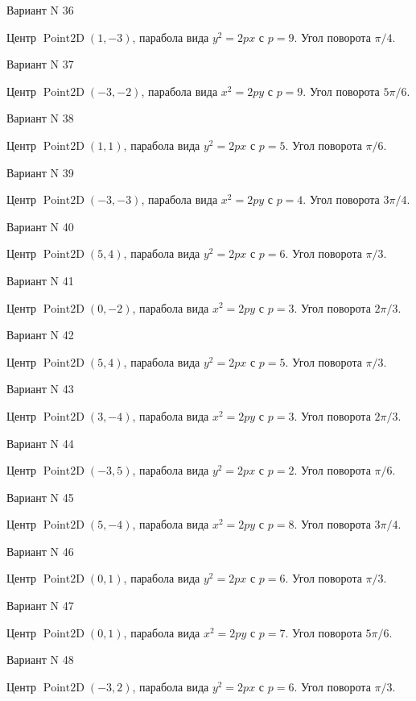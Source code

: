 \documentclass[11pt]{report}
\begin{document}
Вариант N 36

Центр $\operatorname{Point2D}\left(1, -3\right)$, парабола вида $y^{2} = 2px$ с $p = 9$. Угол поворота $\pi / 4$.

Вариант N 37

Центр $\operatorname{Point2D}\left(-3, -2\right)$, парабола вида $x^{2} = 2py$ с $p = 9$. Угол поворота $5 \pi / 6$.

Вариант N 38

Центр $\operatorname{Point2D}\left(1, 1\right)$, парабола вида $y^{2} = 2px$ с $p = 5$. Угол поворота $\pi / 6$.

Вариант N 39

Центр $\operatorname{Point2D}\left(-3, -3\right)$, парабола вида $x^{2} = 2py$ с $p = 4$. Угол поворота $3 \pi / 4$.

Вариант N 40

Центр $\operatorname{Point2D}\left(5, 4\right)$, парабола вида $y^{2} = 2px$ с $p = 6$. Угол поворота $\pi / 3$.

Вариант N 41

Центр $\operatorname{Point2D}\left(0, -2\right)$, парабола вида $x^{2} = 2py$ с $p = 3$. Угол поворота $2 \pi / 3$.

Вариант N 42

Центр $\operatorname{Point2D}\left(5, 4\right)$, парабола вида $y^{2} = 2px$ с $p = 5$. Угол поворота $\pi / 3$.

Вариант N 43

Центр $\operatorname{Point2D}\left(3, -4\right)$, парабола вида $x^{2} = 2py$ с $p = 3$. Угол поворота $2 \pi / 3$.

Вариант N 44

Центр $\operatorname{Point2D}\left(-3, 5\right)$, парабола вида $y^{2} = 2px$ с $p = 2$. Угол поворота $\pi / 6$.

Вариант N 45

Центр $\operatorname{Point2D}\left(5, -4\right)$, парабола вида $x^{2} = 2py$ с $p = 8$. Угол поворота $3 \pi / 4$.

Вариант N 46

Центр $\operatorname{Point2D}\left(0, 1\right)$, парабола вида $y^{2} = 2px$ с $p = 6$. Угол поворота $\pi / 3$.

Вариант N 47

Центр $\operatorname{Point2D}\left(0, 1\right)$, парабола вида $x^{2} = 2py$ с $p = 7$. Угол поворота $5 \pi / 6$.

Вариант N 48

Центр $\operatorname{Point2D}\left(-3, 2\right)$, парабола вида $y^{2} = 2px$ с $p = 6$. Угол поворота $\pi / 3$.
\end{document}
